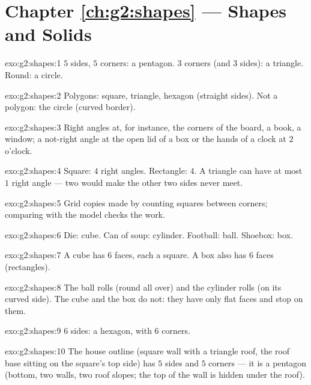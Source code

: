 \section*{Chapter \ref{ch:g2:shapes} --- Shapes and Solids}

\begin{solution}{exo:g2:shapes:1}
$5$ sides, $5$ corners: a pentagon. $3$ corners (and $3$ sides): a
triangle. Round: a circle.
\end{solution}

\begin{solution}{exo:g2:shapes:2}
Polygons: square, triangle, hexagon (straight sides). Not a
polygon: the circle (curved border).
\end{solution}

\begin{solution}{exo:g2:shapes:3}
Right angles at, for instance, the corners of the board, a book, a
window; a not-right angle at the open lid of a box or the hands of
a clock at $2$ o'clock.
\end{solution}

\begin{solution}{exo:g2:shapes:4}
Square: $4$ right angles. Rectangle: $4$. A triangle can have at
most $1$ right angle --- two would make the other two sides never
meet.
\end{solution}

\begin{solution}{exo:g2:shapes:5}
Grid copies made by counting squares between corners; comparing
with the model checks the work.
\end{solution}

\begin{solution}{exo:g2:shapes:6}
Die: cube. Can of soup: cylinder. Football: ball. Shoebox: box.
\end{solution}

\begin{solution}{exo:g2:shapes:7}
A cube has $6$ faces, each a square. A box also has $6$ faces
(rectangles).
\end{solution}

\begin{solution}{exo:g2:shapes:8}
The ball rolls (round all over) and the cylinder rolls (on its
curved side). The cube and the box do not: they have only flat
faces and stop on them.
\end{solution}

\begin{solution}{exo:g2:shapes:9}
$6$ sides: a hexagon, with $6$ corners.
\end{solution}

\begin{solution}{exo:g2:shapes:10}
The house outline (square wall with a triangle roof, the roof base
sitting on the square's top side) has $5$ sides and $5$ corners ---
it is a pentagon (bottom, two walls, two roof slopes; the top of
the wall is hidden under the roof).
\end{solution}
